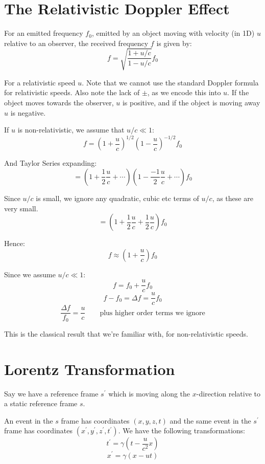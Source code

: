 \section{The Relativistic Doppler Effect}

For an emitted frequency $f_0$, emitted by an object moving with velocity (in 1D) $u$ relative to an observer, the received frequency $f$ is given by:
\[
    f = \sqrt{\frac{1 + u/c}{1 - u/c}} f_0
\]

For a relativistic speed $u$. Note that we cannot use the standard Doppler formula for relativistic speeds. Also note the lack of $\pm$, as we encode this into $u$. If the object moves towards the observer, $u$ is positive, and if the object is moving away $u$ is negative.

If $u$ is non-relativistic, we assume that $u/c \ll 1$:
\[
    f = \left(1 + \frac{u}{c}\right)^{1/2} \left(1 - \frac{u}{c}\right)^{-1/2} f_0
\]

And Taylor Series expanding:
\[
    = \left(1 + \frac{1}{2} \frac{u}{c} + \cdots\right)\left(1 - \frac{-1}{2} \frac{u}{c} + \cdots\right) f_0
\]

Since $u/c$ is small, we ignore any quadratic, cubic etc terms of $u/c$, as these are very small.
\[
    = \left(1 + \frac{1}{2} \frac{u}{c} + \frac{1}{2} \frac{u}{c} \right) f_0
\]

Hence:
\[
    f \approx \left(1 + \frac{u}{c}\right) f_0
\]

Since we assume $u/c \ll 1$:
\[
    f = f_0 + \frac{u}{c} f_0
\]
\[
    f - f_0 = \Delta f = \frac{u}{c} f_0
\]
\[
    \frac{\Delta f}{f_0} = \frac{u}{c} \qquad \text{plus higher order terms we ignore}
\]

This is the classical result that we're familiar with, for non-relativistic speeds.


\section{Lorentz Transformation}
Say we have a reference frame $s^\prime$ which is moving along the $x$-direction relative to a static reference frame $s$.

An event in the $s$ frame has coordinates $(x, y, z, t)$ and the same event in the $s^\prime$ frame has coordinates $(x^\prime, y^\prime, z^\prime, t^\prime)$. We have the following transformations:
\[
    t^\prime = \gamma\left(t - \frac{u}{c^2}x\right)
\]
\[
    x^\prime = \gamma \left(x - ut\right)
\]

